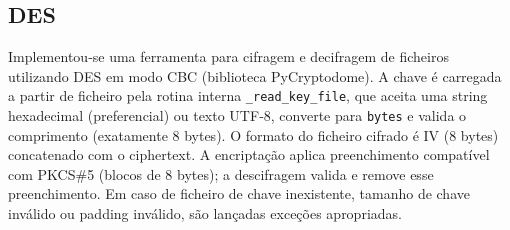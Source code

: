 \documentclass[a4paper]{article}
\begin{document}
\newpage
\subsection{DES}
Implementou‑se uma ferramenta para cifragem e decifragem de ficheiros utilizando DES em modo CBC (biblioteca PyCryptodome).
A chave é carregada a partir de ficheiro pela rotina interna \texttt{\_read\_key\_file}, que aceita uma string hexadecimal (preferencial)
ou texto UTF‑8, converte para \texttt{bytes} e valida o comprimento (exatamente 8 bytes). O formato do ficheiro cifrado é IV (8 bytes) concatenado com o ciphertext.
A encriptação aplica preenchimento compatível com PKCS\#5 (blocos de 8 bytes); a descifragem valida e remove esse preenchimento. Em caso de ficheiro de chave inexistente,
tamanho de chave inválido ou padding inválido, são lançadas exceções apropriadas.\\\\
\end{document}
